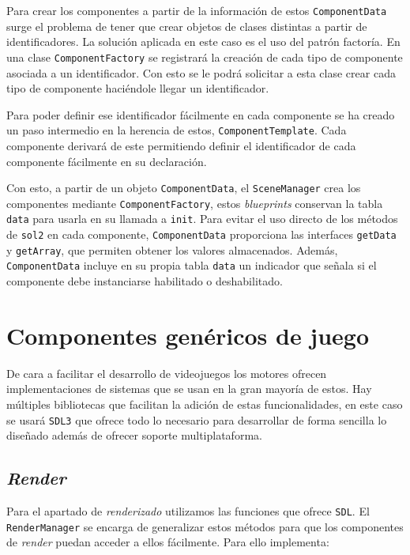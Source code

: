 \medskip

Para crear los componentes a partir de la información de estos \texttt{ComponentData} surge el problema de tener que crear objetos de clases distintas a partir de identificadores. La solución aplicada en este caso es el uso del patrón factoría. En una clase \texttt{ComponentFactory} se registrará la creación de cada tipo de componente asociada a un identificador. Con esto se le podrá solicitar a esta clase crear cada tipo de componente haciéndole llegar un identificador. 

\smallskip

Para poder definir ese identificador fácilmente en cada componente se ha creado un paso intermedio en la herencia de estos, \texttt{ComponentTemplate}. Cada componente derivará de este permitiendo definir el identificador de cada componente fácilmente en su declaración.

\smallskip

Con esto, a partir de un objeto \texttt{ComponentData}, el \texttt{SceneManager} crea los componentes mediante \texttt{ComponentFactory}, estos \textit{blueprints} conservan la tabla \texttt{data} para usarla en su llamada a \texttt{init}. Para evitar el uso directo de los métodos de \texttt{sol2} en cada componente, \texttt{ComponentData} proporciona las interfaces \texttt{getData} y \texttt{getArray}, que permiten obtener los valores almacenados. Además, \texttt{ComponentData} incluye en su propia tabla \texttt{data} un indicador que señala si el componente debe instanciarse habilitado o deshabilitado.


\section{Componentes genéricos de juego}
De cara a facilitar el desarrollo de videojuegos los motores ofrecen implementaciones de sistemas que se usan en la gran mayoría de estos. Hay múltiples bibliotecas que facilitan la adición de estas funcionalidades, en este caso se usará \texttt{SDL3} que ofrece todo lo necesario para desarrollar de forma sencilla lo diseñado además de ofrecer soporte multiplataforma.

\subsection{\textit{Render}}
Para el apartado de \textit{renderizado} utilizamos las funciones que ofrece \texttt{SDL}. El \texttt{RenderManager} se encarga de generalizar estos métodos para que los componentes de \textit{render} puedan acceder a ellos fácilmente. Para ello implementa: 

